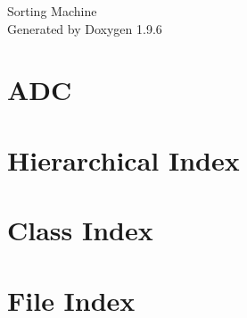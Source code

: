 \documentclass[twoside]{book}
\newcommand{\+}{\discretionary{\mbox{\scriptsize$\hookleftarrow$}}{}{}}
\newcommand{\clearemptydoublepage}{%
    \newpage{\pagestyle{empty}\cleardoublepage}%
  }
\begin{document}
  \raggedbottom
    \hypersetup{pageanchor=false,
                bookmarksnumbered=true,
                pdfencoding=unicode
               }
  \begin{titlepage}
  \vspace*{7cm}
  \begin{center}%
  {\Large Sorting Machine}\\
  \vspace*{1cm}
  {\large Generated by Doxygen 1.9.6}\\
  \end{center}
  \end{titlepage}
  \clearemptydoublepage
  \tableofcontents
  \clearemptydoublepage
  \hypersetup{pageanchor=true}
\chapter{ADC}
\label{md_main_src_hal_adc_readme}

\chapter{Hierarchical Index}

\chapter{Class Index}

\chapter{File Index}

\end{document}
